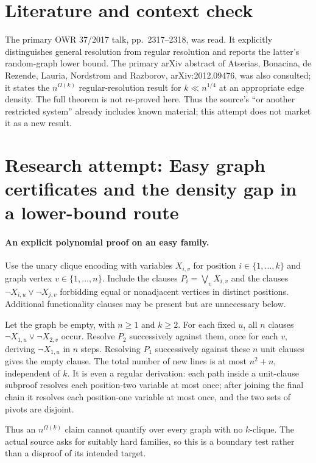 \documentclass[11pt]{article}
\begin{document}
\section{Literature and context check}
The primary OWR 37/2017 talk, pp.~2317--2318, was read. It explicitly distinguishes general resolution from regular resolution and reports the latter's random-graph lower bound. The primary arXiv abstract of Atserias, Bonacina, de Rezende, Lauria, Nordstrom and Razborov, arXiv:2012.09476, was also consulted; it states the $n^{\Omega(k)}$ regular-resolution result for $k\ll n^{1/4}$ at an appropriate edge density. The full theorem is not re-proved here. Thus the source's ``or another restricted system'' already includes known material; this attempt does not market it as a new result.
\section{Research attempt: Easy graph certificates and the density gap in a lower-bound route}

\paragraph{An explicit polynomial proof on an easy family.}
Use the unary clique encoding with variables $X_{i,v}$ for position $i\in\{1,\ldots,k\}$ and graph vertex $v\in\{1,\ldots,n\}$. Include the clauses $P_i=\bigvee_v X_{i,v}$ and the clauses $\neg X_{i,u}\lor\neg X_{j,v}$ forbidding equal or nonadjacent vertices in distinct positions. Additional functionality clauses may be present but are unnecessary below.

Let the graph be empty, with $n\ge1$ and $k\ge2$. For each fixed $u$, all $n$ clauses $\neg X_{1,u}\lor\neg X_{2,v}$ occur. Resolve $P_2$ successively against them, once for each $v$, deriving $\neg X_{1,u}$ in $n$ steps. Resolving $P_1$ successively against these $n$ unit clauses gives the empty clause. The total number of new lines is at most $n^2+n$, independent of $k$. It is even a regular derivation: each path inside a unit-clause subproof resolves each position-two variable at most once; after joining the final chain it resolves each position-one variable at most once, and the two sets of pivots are disjoint.

Thus an $n^{\Omega(k)}$ claim cannot quantify over every graph with no $k$-clique. The actual source asks for suitably hard families, so this is a boundary test rather than a disproof of its intended target.
\end{document}
